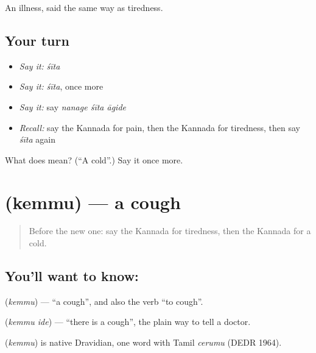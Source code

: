 \begin{grammarlens}[title={What you've built}]
An illness, said the same way as tiredness.
\end{grammarlens}

\subsection*{Your turn}
\begin{itemize}
\raggedright
  \item \emph{Say it:} \emph{śīta}
  \item \emph{Say it:} \emph{śīta}, once more
  \item \emph{Say it:} say \emph{nanage śīta āgide}
  \item \emph{Recall:} say the Kannada for pain, then the Kannada for tiredness, then say \emph{śīta} again
\end{itemize}

\begin{tcolorbox}[breakable,colback=teal!4,colframe=teal!35!black,title={Before you move on}]
What does  mean? (\textquotedblleft{}A cold\textquotedblright{}.) Say it once more.
\end{tcolorbox}
\section[\texorpdfstring{\kn{ಕೆಮ್ಮು} (kemmu)}{ಕೆಮ್ಮು (kemmu)}]{ (kemmu) — a cough}

\label{lesson:KA-C82-cough}



\begin{quote}
Before the new one: say the Kannada for tiredness, then the Kannada for a cold.
\end{quote}

\subsection*{You'll want to know: }
\textbf{} (\emph{kemmu}) — \textquotedblleft{}a cough\textquotedblright{}, and also the verb \textquotedblleft{}to cough\textquotedblright{}.

\textbf{ } (\emph{kemmu ide}) — \textquotedblleft{}there is a cough\textquotedblright{}, the plain way to tell a doctor.

\begin{cousinweb}
\textbf{} (\emph{kemmu}) is native Dravidian, one word with Tamil \emph{cerumu} (DEDR 1964).
\end{cousinweb}

